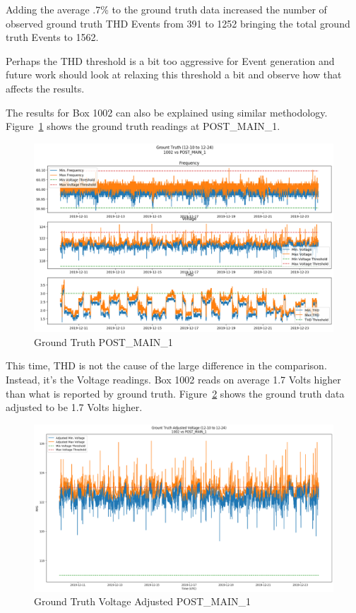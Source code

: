 Adding the average .7\% to the ground truth data increased the number of observed ground truth THD Events from 391 to 1252 bringing the total ground truth Events to 1562.

Perhaps the THD threshold is a bit too aggressive for Event generation and future work should look at relaxing this threshold a bit and observe how that affects the results.

The results for Box 1002 can also be explained using similar methodology. Figure~\ref{fig:gt_all_post_1} shows the ground truth readings at POST\_MAIN\_1.

\begin{figure}[H]
    \centering
    \includegraphics[width=\linewidth]{figures/gt_all_1002_POST_MAIN_1.png}
    \caption{Ground Truth POST\_MAIN\_1}
    \label{fig:gt_all_post_1}
\end{figure}

This time, THD is not the cause of the large difference in the comparison. Instead, it's the Voltage readings. Box 1002 reads on average 1.7 Volts higher than what is reported by ground truth. Figure~\ref{fig:gt_adj_post_1} shows the ground truth data adjusted to be 1.7 Volts higher.

\begin{figure}[H]
    \centering
    \includegraphics[width=\linewidth]{figures/gt_adj_1002_POST_MAIN_1.png}
    \caption{Ground Truth Voltage Adjusted POST\_MAIN\_1}
    \label{fig:gt_adj_post_1}
\end{figure}

